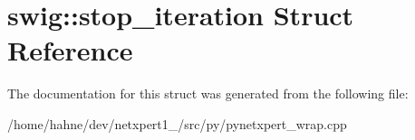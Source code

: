 \hypertarget{structswig_1_1stop__iteration}{}\section{swig\+:\+:stop\+\_\+iteration Struct Reference}
\label{structswig_1_1stop__iteration}


The documentation for this struct was generated from the following file\+:\begin{DoxyCompactItemize}
\item 
/home/hahne/dev/netxpert1\+\_/src/py/pynetxpert\+\_\+wrap.\+cpp\end{DoxyCompactItemize}
